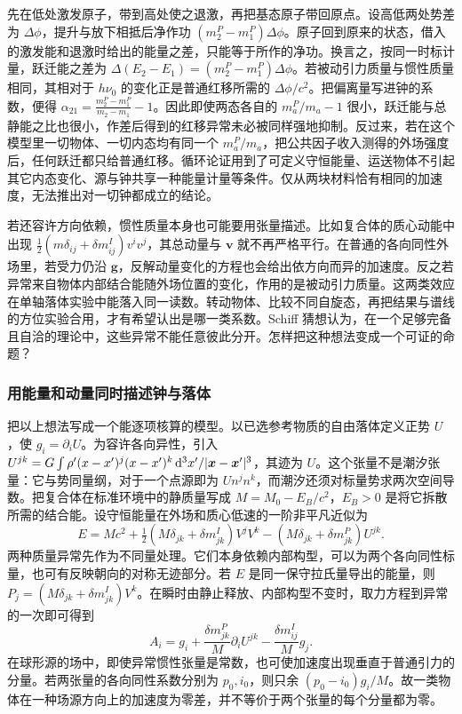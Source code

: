 先在低处激发原子，带到高处使之退激，再把基态原子带回原点。设高低两处势差为 $\Delta\phi$，提升与放下相抵后净作功 $(m_2^P-m_1^P)\Delta\phi$。原子回到原来的状态，借入的激发能和退激时给出的能量之差，只能等于所作的净功。换言之，按同一时标计量，跃迁能之差为 $\Delta(E_2-E_1)=(m_2^P-m_1^P)\Delta\phi$。若被动引力质量与惯性质量相同，其相对于 $h\nu_0$ 的变化正是普通红移所需的 $\Delta\phi/c^2$。把偏离量写进钟的系数，便得 $\alpha_{21}=\frac{m_2^P-m_1^P}{m_2-m_1}-1$。因此即使两态各自的 $m_a^P/m_a-1$ 很小，跃迁能与总静能之比也很小，作差后得到的红移异常未必被同样强地抑制。反过来，若在这个模型里一切物体、一切内态均有同一个 $m_a^P/m_a$，把公共因子收入测得的外场强度后，任何跃迁都只给普通红移。循环论证用到了可定义守恒能量、运送物体不引起其它内态变化、源与钟共享一种能量计量等条件。仅从两块材料恰有相同的加速度，无法推出对一切钟都成立的结论。

若还容许方向依赖，惯性质量本身也可能要用张量描述。比如复合体的质心动能中出现 $\tfrac12(m\delta_{ij}+\delta m^I_{ij})v^iv^j$，其总动量与 $\bm v$ 就不再严格平行。在普通的各向同性外场里，若受力仍沿 $\bm g$，反解动量变化的方程也会给出依方向而异的加速度。反之若异常来自物体内部结合能随外场位置的变化，作用的是被动引力质量。这两类效应在单轴落体实验中能落入同一读数。转动物体、比较不同自旋态，再把结果与谱线的方位实验合用，才有希望认出是哪一类系数。Schiff 猜想认为，在一个足够完备且自洽的理论中，这些异常不能任意彼此分开。怎样把这种想法变成一个可证的命题？

\subsubsection{用能量和动量同时描述钟与落体}

把以上想法写成一个能逐项核算的模型。以已选参考物质的自由落体定义正势 $U$，使 $g_i=\partial_iU$。为容许各向异性，引入 $U^{jk}=G\int\rho'(x-x')^j(x-x')^k\,\dd^3x'/|\bm x-\bm x'|^3$，其迹为 $U$。这个张量不是潮汐张量：它与势同量纲，对于一个点源即为 $Un^jn^k$，而潮汐还须对标量势求两次空间导数。把复合体在标准环境中的静质量写成 $M=M_0-E_B/c^2$，$E_B>0$ 是将它拆散所需的结合能。设守恒能量在外场和质心低速的一阶非平凡近似为
\[
 E=Mc^2+\tfrac12(M\delta_{jk}+\delta m^I_{jk})V^jV^k
              -(M\delta_{jk}+\delta m^P_{jk})U^{jk}.
\]
两种质量异常先作为不同量处理。它们本身依赖内部构型，可以为两个各向同性标量，也可有反映朝向的对称无迹部分。若 $E$ 是同一保守拉氏量导出的能量，则 $P_j=(M\delta_{jk}+\delta m^I_{jk})V^k$。在瞬时由静止释放、内部构型不变时，取力方程到异常的一次即可得到
\[
 A_i=g_i+\frac{\delta m^P_{jk}}{M}\partial_iU^{jk}
             -\frac{\delta m^I_{ij}}{M}g_j .
\]
在球形源的场中，即使异常惯性张量是常数，也可使加速度出现垂直于普通引力的分量。若两张量的各向同性系数分别为 $p_0,i_0$，则只余 $(p_0-i_0)g_i/M$。故一类物体在一种场源方向上的加速度为零差，并不等价于两个张量的每个分量都为零。

